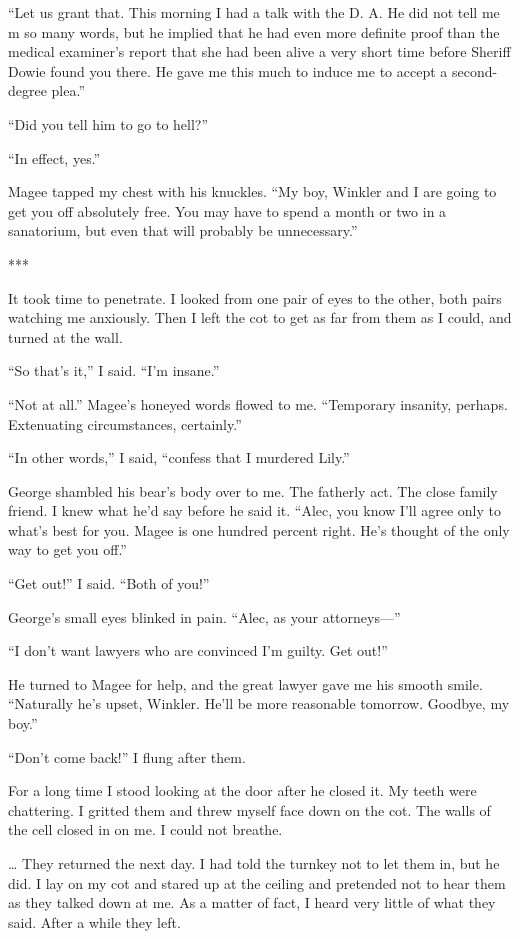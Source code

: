 \documentclass{novel}
\begin{document}
“Let us grant that. This morning I had a talk with the D. A. He did not tell me m so many words, but he implied that he had even more definite proof than the medical examiner’s report that she had been alive a very short time before Sheriff Dowie found you there. He gave me this much to induce me to accept a second-degree plea.”

“Did you tell him to go to hell?”

“In effect, yes.”

Magee tapped my chest with his knuckles. “My boy, Winkler and I are going to get you off absolutely free. You may have to spend a month or two in a sanatorium, but even that will probably be unnecessary.”

***

It took time to penetrate. I looked from one pair of eyes to the other, both pairs watching me anxiously. Then I left the cot to get as far from them as I could, and turned at the wall.

“So that’s it,” I said. “I’m insane.”

“Not at all.” Magee’s honeyed words flowed to me. “Temporary insanity, perhaps. Extenuating circumstances, certainly.”

“In other words,” I said, “confess that I murdered Lily.”

George shambled his bear’s body over to me. The fatherly act. The close family friend. I knew what he’d say before he said it. “Alec, you know I’ll agree only to what’s best for you. Magee is one hundred percent right. He’s thought of the only way to get you off.”

“Get out!” I said. “Both of you!”

George’s small eyes blinked in pain. “Alec, as your attorneys—”

“I don’t want lawyers who are convinced I’m guilty. Get out!”

He turned to Magee for help, and the great lawyer gave me his smooth smile. “Naturally he’s upset, Winkler. He’ll be more reasonable tomorrow. Goodbye, my boy.”

“Don’t come back!” I flung after them.

For a long time I stood looking at the door after he closed it. My teeth were chattering. I gritted them and threw myself face down on the cot. The walls of the cell closed in on me. I could not breathe.

… They returned the next day. I had told the turnkey not to let them in, but he did. I lay on my cot and stared up at the ceiling and pretended not to hear them as they talked down at me. As a matter of fact, I heard very little of what they said. After a while they left.
\end{document}
